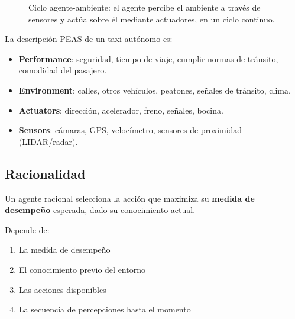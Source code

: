 \begin{figure}[H]
\centering
{}
\caption{Ciclo agente-ambiente: el agente percibe el ambiente a través de sensores y actúa sobre él mediante
actuadores, en un ciclo continuo.}
\end{figure}

\begin{example}
    La descripción PEAS de un taxi autónomo es:
    \begin{itemize}
        \item \textbf{Performance}: seguridad, tiempo de viaje, cumplir normas de tránsito, comodidad del pasajero.
        \item \textbf{Environment}: calles, otros vehículos, peatones, señales de tránsito, clima.
        \item \textbf{Actuators}: dirección, acelerador, freno, señales, bocina.
        \item \textbf{Sensors}: cámaras, GPS, velocímetro, sensores de proximidad (LIDAR/radar).
    \end{itemize}
\end{example}

\subsection{Racionalidad}

Un agente racional selecciona la acción que maximiza su \textbf{medida de desempeño} esperada, dado su conocimiento actual.

Depende de:
\begin{enumerate}
    \item La medida de desempeño
    \item El conocimiento previo del entorno
    \item Las acciones disponibles
    \item La secuencia de percepciones hasta el momento
\end{enumerate}

